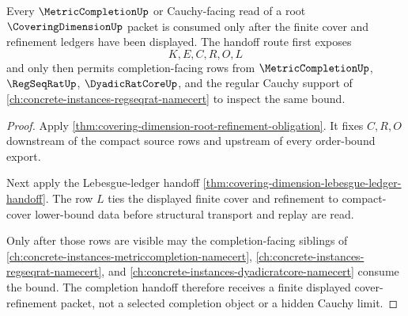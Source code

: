\begin{theorem}
\label{thm:covering-dimension-root-completion-handoff}
Every $\MetricCompletionUp$ or Cauchy-facing read of a root $\CoveringDimensionUp$ packet is consumed only after the finite cover and refinement ledgers have been displayed. The handoff route first exposes
$$
K,E,C,R,O,L
$$
and only then permits completion-facing rows from $\MetricCompletionUp$, $\RegSeqRatUp$, $\DyadicRatCoreUp$, and the regular Cauchy support of \autoref{ch:concrete-instances-regseqrat-namecert} to inspect the same bound.
\end{theorem}
\begin{proof}
Apply \autoref{thm:covering-dimension-root-refinement-obligation}. It fixes $C,R,O$ downstream of the compact source rows and upstream of every order-bound export.

Next apply the Lebesgue-ledger handoff \autoref{thm:covering-dimension-lebesgue-ledger-handoff}. The row $L$ ties the displayed finite cover and refinement to compact-cover lower-bound data before structural transport and replay are read.

Only after those rows are visible may the completion-facing siblings of \autoref{ch:concrete-instances-metriccompletion-namecert}, \autoref{ch:concrete-instances-regseqrat-namecert}, and \autoref{ch:concrete-instances-dyadicratcore-namecert} consume the bound. The completion handoff therefore receives a finite displayed cover-refinement packet, not a selected completion object or a hidden Cauchy limit.
\end{proof}

